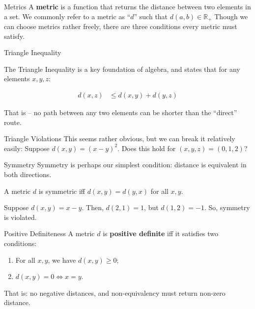\documentclass[10pt]{beamer}
\begin{document}
\begin{frame}{Metrics}
    A \textbf{metric} is a function that returns the distance between two elements in a set.
\vspace{.5cm}
    We commonly refer to a metric as ``$d$'' such that $d(a,b) \in \mathbb{R}_+$
\vspace{.5cm}
    Though we can choose metrics rather freely, there are three conditions every metric must satisfy.
\end{frame}

\begin{frame}{Triangle Inequality}

The Triangle Inequality is a key foundation of algebra, and states that for any elements $x,y,z$:

\begin{align*}
    d(x,z) & \leq d(x,y) + d(y,z)
\end{align*}

That is -- no path between any two elements can be shorter than the ``direct'' route.

\end{frame}

\begin{frame}{Triangle Violations}
This seems rather obvious, but we can break it relatively easily:
\vspace{1cm}
Suppose $d(x,y) = (x - y)^2$. Does this hold for $(x,y,z) = (0,1,2)$?
\end{frame}

\begin{frame}{Symmetry}
Symmetry is perhaps our simplest condition: distance is equivalent in both directions.
\vspace{.7cm}

A metric $d$ is symmetric iff $d(x,y) = d(y,x)$ for all $x,y$.
\vspace{.7cm}

Suppose $d(x,y) = x-y$. Then, $d(2,1) = 1$, but $d(1,2) = -1$. So, symmetry is violated.
\end{frame}


\begin{frame}{Positive Definiteness}
A metric $d$ is \textbf{positive definite} iff it satisfies two conditions:

\begin{enumerate}
    \item For all $x,y$, we have $d(x,y) \geq 0$;
    \item $d(x,y) = 0 \iff x = y$.
\end{enumerate}

That is: no negative distances, and non-equivalency must return non-zero distance.

\end{frame}
\end{document}
